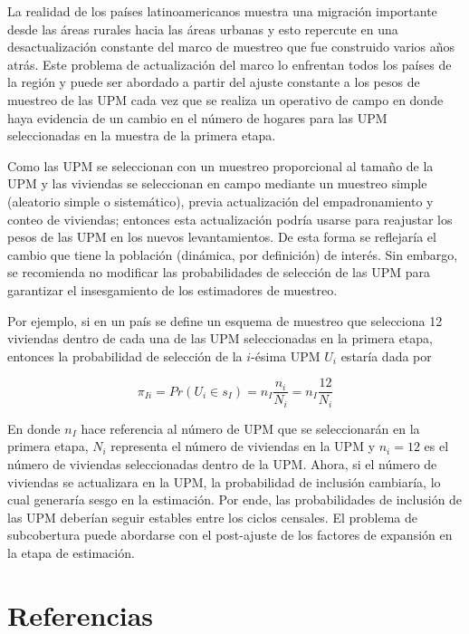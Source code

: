 \documentclass[
  12pt,
  spanish,
]{book}
\begin{document}
La realidad de los países latinoamericanos muestra una migración importante desde las áreas rurales hacia las áreas urbanas y esto repercute en una desactualización constante del marco de muestreo que fue construido varios años atrás. Este problema de actualización del marco lo enfrentan todos los países de la región y puede ser abordado a partir del ajuste constante a los pesos de muestreo de las UPM cada vez que se realiza un operativo de campo en donde haya evidencia de un cambio en el número de hogares para las UPM seleccionadas en la muestra de la primera etapa.

Como las UPM se seleccionan con un muestreo proporcional al tamaño de la UPM y las viviendas se seleccionan en campo mediante un muestreo simple (aleatorio simple o sistemático), previa actualización del empadronamiento y conteo de viviendas; entonces esta actualización podría usarse para reajustar los pesos de las UPM en los nuevos levantamientos. De esta forma se reflejaría el cambio que tiene la población (dinámica, por definición) de interés. Sin embargo, se recomienda no modificar las probabilidades de selección de las UPM para garantizar el insesgamiento de los estimadores de muestreo.

Por ejemplo, si en un país se define un esquema de muestreo que selecciona 12 viviendas dentro de cada una de las UPM seleccionadas en la primera etapa, entonces la probabilidad de selección de la \(i\)-ésima UPM \(U_i\) estaría dada por

\[
\pi_{Ii}=Pr(U_i \in s_I)=n_I\frac{n_i}{N_i}=n_I\frac{12}{N_i}
\]

En donde \(n_I\) hace referencia al número de UPM que se seleccionarán en la primera etapa, \(N_i\) representa el número de viviendas en la UPM y \(n_i=12\) es el número de viviendas seleccionadas dentro de la UPM. Ahora, si el número de viviendas se actualizara en la UPM, la probabilidad de inclusión cambiaría, lo cual generaría sesgo en la estimación. Por ende, las probabilidades de inclusión de las UPM deberían seguir estables entre los ciclos censales. El problema de subcobertura puede abordarse con el post-ajuste de los factores de expansión en la etapa de estimación.

\hypertarget{referencias}{%
\chapter*{Referencias}\label{referencias}}

  
\end{document}
